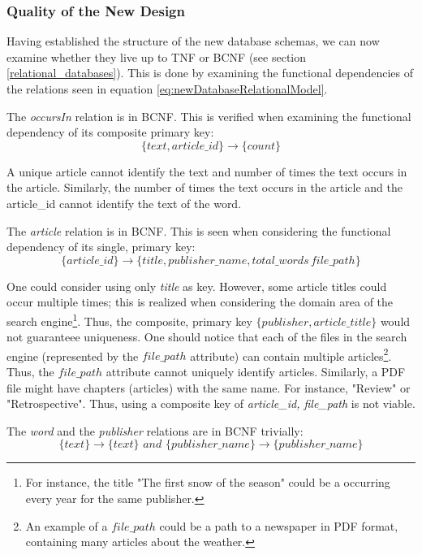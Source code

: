 \subsubsection*{Quality of the New Design}
Having established the structure of the new database schemas, we can now examine whether they live up to TNF or BCNF (see section \ref{relational_databases}).
This is done by examining the functional dependencies of the relations seen in equation \ref{eq:newDatabaseRelationalModel}.

The \textit{occursIn} relation is in BCNF. 
This is verified when examining the functional dependency of its composite primary key:
\begin{equation*}
 \{text,article\_id\}\rightarrow \{count\}   
\end{equation*}

A unique article cannot identify the text and number of times the text occurs in the article.
Similarly, the number of times the text occurs in the article and the article\_id cannot identify the text of the word.

The \textit{article} relation is in BCNF. 
This is seen when considering the functional dependency of its single, primary key:
\begin{equation*}
    \{article\_id\} \rightarrow \{title, publisher\_name,total\_words\, file\_path\}
\end{equation*}

One could consider using only \textit{title} as key. 
However, some article titles could occur multiple times; this is realized when considering the domain area of the \knox{} search engine\footnote{For instance, the title "The first snow of the season" could be a occurring every year for the same publisher.}. Thus, the composite, primary key $\{ publisher,article\_title \}$ would not guaranteee uniqueness.
One should notice that each of the files in the search engine (represented by the $file\_path$ attribute) can contain multiple articles\footnote{An example of a $file\_path$ could be a path to a newspaper in PDF format, containing many articles about the weather.}.
Thus, the $file\_path$ attribute cannot uniquely identify articles.
Similarly, a PDF file might have chapters (articles) with the same name. For instance, "Review" or "Retrospective".
Thus, using a composite key of \textit{article\_id, file\_path} is not viable. 

The \textit{word} and the \textit{publisher} relations are in BCNF trivially:
\begin{equation*}
    \{ text\} \rightarrow \{text\} \textit{\ and\ } \{ publisher\_name \} \rightarrow \{ publisher\_name\}
\end{equation*}


